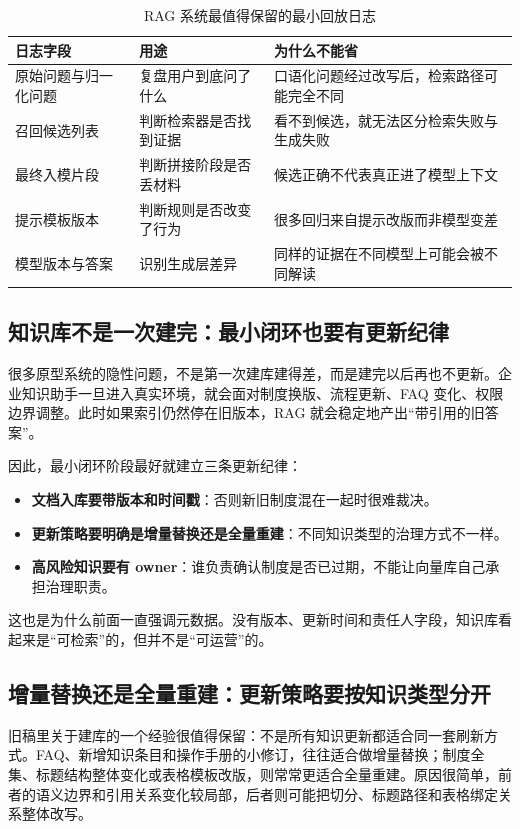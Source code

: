 \begin{table}[H]
\centering
\small
\begin{tabularx}{\textwidth}{>{\raggedright\arraybackslash}p{3cm}>{\raggedright\arraybackslash}p{3cm}>{\raggedright\arraybackslash}X}
\toprule
\textbf{日志字段} & \textbf{用途} & \textbf{为什么不能省} \\
\midrule
原始问题与归一化问题 & 复盘用户到底问了什么 & 口语化问题经过改写后，检索路径可能完全不同 \\
召回候选列表 & 判断检索器是否找到证据 & 看不到候选，就无法区分检索失败与生成失败 \\
最终入模片段 & 判断拼接阶段是否丢材料 & 候选正确不代表真正进了模型上下文 \\
提示模板版本 & 判断规则是否改变了行为 & 很多回归来自提示改版而非模型变差 \\
模型版本与答案 & 识别生成层差异 & 同样的证据在不同模型上可能会被不同解读 \\
\bottomrule
\end{tabularx}
\caption{RAG 系统最值得保留的最小回放日志}
\label{tab:rag-logs}
\end{table}

\subsection{知识库不是一次建完：最小闭环也要有更新纪律}
很多原型系统的隐性问题，不是第一次建库建得差，而是建完以后再也不更新。企业知识助手一旦进入真实环境，就会面对制度换版、流程更新、FAQ 变化、权限边界调整。此时如果索引仍然停在旧版本，RAG 就会稳定地产出“带引用的旧答案”。

因此，最小闭环阶段最好就建立三条更新纪律：
\begin{itemize}
  \item \textbf{文档入库要带版本和时间戳}：否则新旧制度混在一起时很难裁决。
  \item \textbf{更新策略要明确是增量替换还是全量重建}：不同知识类型的治理方式不一样。
  \item \textbf{高风险知识要有 owner}：谁负责确认制度是否已过期，不能让向量库自己承担治理职责。
\end{itemize}

这也是为什么前面一直强调元数据。没有版本、更新时间和责任人字段，知识库看起来是“可检索”的，但并不是“可运营”的。

\subsection{增量替换还是全量重建：更新策略要按知识类型分开}
旧稿里关于建库的一个经验很值得保留：不是所有知识更新都适合同一套刷新方式。FAQ、新增知识条目和操作手册的小修订，往往适合做增量替换；制度全集、标题结构整体变化或表格模板改版，则常常更适合全量重建。原因很简单，前者的语义边界和引用关系变化较局部，后者则可能把切分、标题路径和表格绑定关系整体改写。

